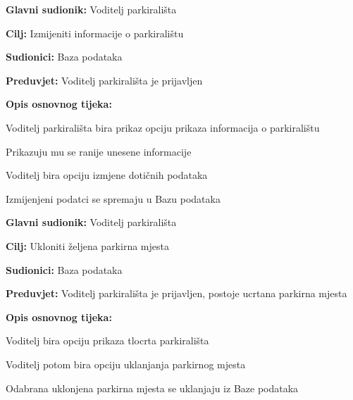 \noindent {}
\begin{packed_item}

\item \textbf{Glavni sudionik: }Voditelj parkirališta
\item  \textbf{Cilj:} Izmijeniti informacije o parkiralištu
\item  \textbf{Sudionici:} Baza podataka
\item  \textbf{Preduvjet:} Voditelj parkirališta je prijavljen
\item  \textbf{Opis osnovnog tijeka:}

\item[] \begin{packed_enum}
	
	\item Voditelj parkirališta bira prikaz opciju prikaza informacija o parkiralištu
	\item Prikazuju mu se ranije unesene informacije
	\item Voditelj bira opciju izmjene dotičnih podataka 
	\item Izmijenjeni podatci se spremaju u Bazu podataka
	
\end{packed_enum}
\end{packed_item}


\noindent {}
\begin{packed_item}

\item \textbf{Glavni sudionik: }Voditelj parkirališta
\item  \textbf{Cilj:} Ukloniti željena parkirna mjesta
\item  \textbf{Sudionici:} Baza podataka
\item  \textbf{Preduvjet:} Voditelj parkirališta je prijavljen, postoje ucrtana parkirna mjesta
\item  \textbf{Opis osnovnog tijeka:}

\item[] \begin{packed_enum}
	
	\item Voditelj bira opciju prikaza tlocrta parkirališta
	\item Voditelj potom bira opciju uklanjanja parkirnog mjesta
	\item Odabrana uklonjena parkirna mjesta se uklanjaju iz Baze podataka
	
\end{packed_enum}


\end{packed_item}

